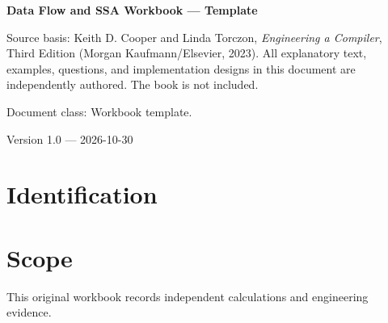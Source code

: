\documentclass[10pt,letterpaper]{article}
\begin{document}
\hypersetup{pageanchor=false}%
\begin{titlepage}
\centering\vspace*{1.0in}
{\Huge\bfseries\textcolor{CompilerBlue}{Data Flow and SSA Workbook --- Template}\par}
\vspace{.22in}{\Large Derivations, technical evidence and review\par}
\vspace{.4in}{\large Compiler Engineering Documentation Suite\par}
\vfill
\begin{minipage}{.86\linewidth}\small
Source basis: Keith D. Cooper and Linda Torczon, \emph{Engineering a Compiler}, Third Edition (Morgan Kaufmann/Elsevier, 2023). All explanatory text, examples, questions, and implementation designs in this document are independently authored. The book is not included.\par\medskip
Document class: Workbook template.
\end{minipage}
\vfill\textcolor{CompilerGray}{Version 1.0 --- 2026-10-30}\par
\end{titlepage}\hypersetup{pageanchor=true}
\tableofcontents\clearpage
\section{Identification}
\section{Scope}
 This original workbook records independent calculations and engineering evidence.
\end{document}
